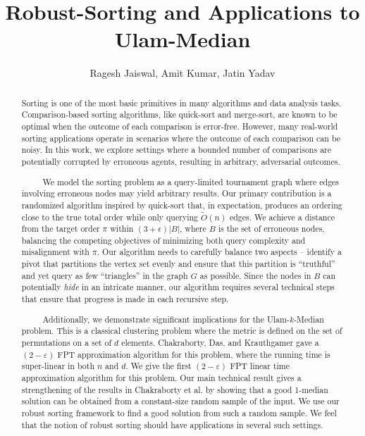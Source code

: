 \documentclass[11pt]{llncs}
\begin{document}
\title{Robust-Sorting and Applications to Ulam-Median}
\author{Ragesh Jaiswal, Amit Kumar, Jatin Yadav}

\maketitle

\begin{abstract}
Sorting is one of the most basic primitives in many algorithms and data analysis tasks. Comparison-based sorting algorithms, like quick-sort and merge-sort, are known to be optimal when the outcome of each comparison is error-free. However, many real-world sorting applications operate in scenarios where the outcome of each comparison can be noisy. 
In this work, we explore settings where a bounded number of comparisons are potentially corrupted by erroneous agents, resulting in arbitrary, adversarial outcomes.

\ \ \ \ \ We model the sorting problem as a query-limited tournament graph where edges involving erroneous nodes may yield arbitrary results. Our primary contribution is a randomized algorithm inspired by quick-sort that, in expectation, produces an ordering close to the true total order while only querying $\tilde{O}(n)$ edges. 
We achieve a distance from the target order $\pi$ within $(3 + \epsilon)|B|$, where $B$ is the set of erroneous nodes, balancing the competing objectives of minimizing both query complexity and misalignment with $\pi$. Our algorithm needs to carefully balance two aspects -- identify a pivot that partitions the vertex set evenly and ensure that this partition is ``truthful'' and yet query as few ``triangles'' in the graph $G$ as possible. Since the nodes in $B$ can potentially {\em hide} in an intricate manner, our algorithm requires several technical steps that ensure that progress is made in each recursive step. 

\ \ \ \ \ Additionally, we demonstrate significant implications for the Ulam-$k$-Median problem. This is a classical clustering problem where the metric is defined on the set of permutations on a set of $d$ elements.  Chakraborty, Das, and Krauthgamer gave a $(2-\varepsilon)$ FPT approximation algorithm for this problem, where the running time is super-linear in both $n$ and $d$. We give the first $(2-\varepsilon)$ FPT linear time approximation algorithm for this problem. Our main technical result gives a strengthening of the results in Chakraborty et al. by showing that a good 1-median solution can be obtained from a constant-size random sample of the input. We use our robust sorting framework to find a good solution from such a random sample. We feel that the notion of robust sorting should have applications in several such settings. 
\end{abstract}
\end{document}
